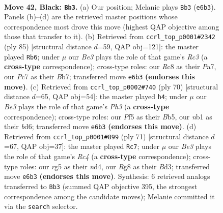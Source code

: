 \documentclass[11pt]{article}
\begin{document}
\clearpage

\begin{figure}[p]\centering
\begin{subfigure}{0.46\textwidth}\centering
\resizebox{\linewidth}{!}{%
\newchessgame
\chessboard[
  setfen={2r1k1r1/p1p5/P1p1b1p1/2P2pRp/1P3P1P/8/8/RN2K3 b Q - 7 42},
  showmover=false,
  pgfstyle=straightmove, color=movearrow, markmove={e6-b3}
]}
\caption{}
\end{subfigure}\hfill
\begin{subfigure}{0.46\textwidth}\centering
\resizebox{\linewidth}{!}{%
\newchessgame
\chessboard[
  setfen={8/pbr1k3/2r1p1p1/4RpP1/P1pR1P2/2P5/BP1K4/8 b - - 16 43},
  showmover=false,
  pgfstyle=straightmove, color=movearrow, markmove={c6-b6}
]}
\caption{}
\end{subfigure}
\\[4pt]
\begin{subfigure}{0.46\textwidth}\centering
\resizebox{\linewidth}{!}{%
\newchessgame
\chessboard[
  setfen={3r2k1/p4p2/1p1bp1p1/1B1r2Pp/P3RP2/7P/2PPK3/3R4 w - - 1 36},
  showmover=false,
  pgfstyle=straightmove, color=movearrow, markmove={h3-h4}
]}
\caption{}
\end{subfigure}\hfill
\begin{subfigure}{0.46\textwidth}\centering
\resizebox{\linewidth}{!}{%
\newchessgame
\chessboard[
  setfen={r5k1/5p2/6pp/Ppr5/1R1Np1PP/3bP3/5P1K/R7 b - - 0 36},
  showmover=false,
  pgfstyle=straightmove, color=movearrow, markmove={c5-c7}
]}
\caption{}
\end{subfigure}
\caption{\textbf{Move 42, Black: \texttt{Bb3}.} (a) Our position; Melanie plays \texttt{Bb3} (\texttt{e6b3}). Panels (b)--(d) are the retrieved master positions whose correspondence most drove this move (highest QAP objective among those that transfer to it). (b) Retrieved from \texttt{ccrl\_top\_p0001\#2342} (ply 85) [structural distance $d$=59, QAP obj=121]: the master played \texttt{Rb6}; under $\mu$ our \emph{Be3} plays the role of that game's \emph{Rc3} (a \textbf{cross-type} correspondence); cross-type roles: our \emph{R}c8 as their \emph{P}a7, our \emph{P}c7 as their \emph{B}b7; transferred move \texttt{e6b3} \textbf{(endorses this move)}. (c) Retrieved from \texttt{ccrl\_top\_p0002\#740} (ply 70) [structural distance $d$=65, QAP obj=54]: the master played \texttt{h4}; under $\mu$ our \emph{Be3} plays the role of that game's \emph{Ph3} (a \textbf{cross-type} correspondence); cross-type roles: our \emph{P}f5 as their \emph{B}b5, our \emph{n}b1 as their \emph{b}d6; transferred move \texttt{e6b3} \textbf{(endorses this move)}. (d) Retrieved from \texttt{ccrl\_top\_p0001\#899} (ply 71) [structural distance $d$=67, QAP obj=37]: the master played \texttt{Rc7}; under $\mu$ our \emph{Be3} plays the role of that game's \emph{Rc4} (a \textbf{cross-type} correspondence); cross-type roles: our \emph{r}g5 as their \emph{n}d4, our \emph{R}g8 as their \emph{B}d3; transferred move \texttt{e6b3} \textbf{(endorses this move)}. Synthesis: 6 retrieved analogs transferred to \texttt{Bb3} (summed QAP objective 395, the strongest correspondence among the candidate moves); Melanie committed it via the \texttt{search} selector.}
\label{fig:thought-m83}
\end{figure}
\end{document}
